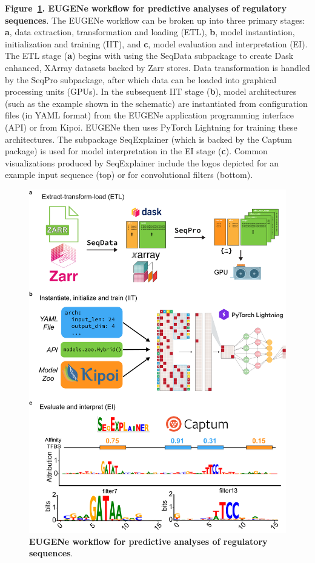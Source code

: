\thispagestyle{plain}
\noindent
\textbf{Figure~\ref{fig:1 Figure 1}. EUGENe workflow for predictive analyses of regulatory sequences}. The EUGENe workflow can be broken up into three primary stages: \textbf{a}, data extraction, transformation and loading (ETL), \textbf{b}, model instantiation, initialization and training (IIT), and \textbf{c}, model evaluation and interpretation (EI). The ETL stage (\textbf{a}) begins with using the SeqData subpackage to create Dask enhanced, XArray datasets backed by Zarr stores. Data transformation is handled by the SeqPro subpackage, after which data can be loaded into graphical processing units (GPUs). In the subsequent IIT stage (\textbf{b}), model architectures (such as the example shown in the schematic) are instantiated from configuration files (in YAML format) from the EUGENe application programming interface (API) or from Kipoi. EUGENe then uses PyTorch Lightning for training these architectures. The subpackage SeqExplainer (which is backed by the Captum package) is used for model interpretation in the EI stage (\textbf{c}). Common visualizations produced by SeqExplainer include the logos depicted for an example input sequence (top) or for convolutional filters (bottom).

\clearpage

\begin{figure}[!htbp]
    \centering
    \includegraphics[height=0.8\textheight, keepaspectratio]{1_figures-and-files/figure1.png}
    \caption[EUGENe workflow for predictive analyses of regulatory sequences]{\textbf{EUGENe workflow for predictive analyses of regulatory sequences}.}
    \label{fig:1 Figure 1}
\end{figure}

